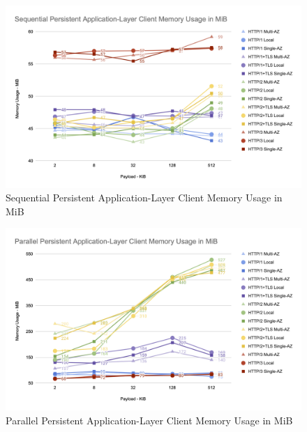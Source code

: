 \begin{figure}[h!]
    \centering
    \includegraphics[width=\linewidth]{figures/charts/Sequential Persistent Application-Layer Client Memory Usage in MiB.png}
    \caption{Sequential Persistent Application-Layer Client Memory Usage in MiB}
    \label{fig:sequential_client_app_memory}
\end{figure}
\begin{figure}[h!]
    \centering
    \includegraphics[width=\linewidth]{figures/charts/Parallel Persistent Application-Layer Client Memory Usage in MiB.png}
    \caption{Parallel Persistent Application-Layer Client Memory Usage in MiB}
    \label{fig:parallel_client_app_memory}
\end{figure}


